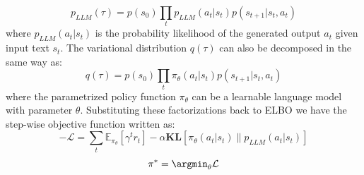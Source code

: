 \begin{equation}\label{eq: llm prior}
    p_{LLM}(\tau) = p(s_0)\prod_t p_{LLM}(a_t|s_t)p(s_{t+1}|s_t, a_t)
\end{equation}
where $p_{LLM}(a_t|s_t)$ is the probability likelihood of the generated output $a_t$ given input text $s_t$. The variational distribution $q(\tau)$ can also be decomposed in the same way as:
\begin{equation}
    q(\tau) = p(s_0)\prod_t \pi_{\theta}(a_t|s_t)p(s_{t+1}|s_t, a_t)
\end{equation}
where the parametrized policy function $\pi_{\theta}$ can be a learnable language model with parameter $\theta$. Substituting these factorizations back to ELBO we have the step-wise objective function written as:
\begin{equation}
    -\mathcal{L} = \sum_{t} \mathbb{E}_{\pi_{\theta}}\left[\gamma^t r_t \right] - \alpha \textbf{KL}\left[ \pi_{\theta}(a_t|s_t) \| p_{LLM}(a_t|s_t) \right]
\end{equation}
\begin{equation}
    \pi^{*} = \argmin_{\theta} \mathcal{L}
\end{equation}



